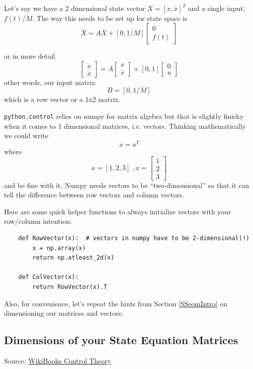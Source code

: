 Let's say we have a 2 dimensional state vector $X=[x,\dot{x}]^T$ and
a single input, $f(t)/M$. The way this needs to be set up for state
space is
\[
\dot{X} = AX + [0,1/M]\begin{bmatrix} 0 \\f(t) \end{bmatrix}
\]

or in more detail
\[
\begin{bmatrix}\dot{x}\\ \ddot{x}\end{bmatrix} = A\begin{bmatrix}x\\ \dot{x}\end{bmatrix} + [0,1]\begin{bmatrix} 0\\u \end{bmatrix}
\]
other words, our input matrix
\[
B = [0,1/M]
\]
which is a row vector or a 1x2 matrix.

{\tt python.control} relies on {numpy} for matrix algebra but that is
slightly finicky when it comes to 1 dimensional matrices, i.e. vectors.
Thinking mathematically we could write
\[
x = a^T
\]
where
\[ a = [1, 2, 3] \;, x = \begin{bmatrix} 1\\2\\3 \end{bmatrix}
\]
and be fine with it.   Numpy needs vectors to be ``two-dimensional'' so that it
can tell the difference between row vectors and column vectors.

Here are some quick helper functions to always initialize vectors with your
row/column intention:
\begin{verbatim}
    def RowVector(x):  # vectors in numpy have to be 2-dimensional(!)
        x = np.array(x)
        return np.atleast_2d(x)

    def ColVector(x):
        return RowVector(x).T
\end{verbatim}

Also, for convenience, let's repeat the hints from Section \ref{SSeomIntro} on
dimensioning our matrices and vectors:

\subsection*{Dimensions of your State Equation Matrices}Source: \href{https://en.wikibooks.org/wiki/Control_Systems/State-Space_Equations}{WikiBooks Control Theory}

